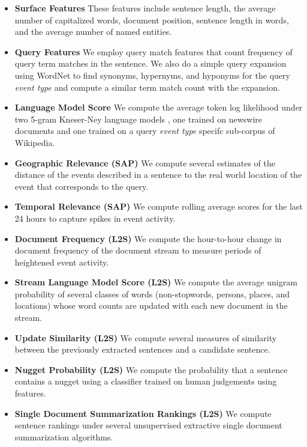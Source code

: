 \begin{itemize}
    \item \textbf{Surface Features} These features 
include sentence length, the average number of capitalized words,
document position, sentence length in words, and the average number of 
named entities.
    \item \textbf{Query Features} We employ query match features that count frequency of query term matches
in the sentence. We also do a simple query expansion using WordNet 
\citep{miller1995wordnet}
to find  synonyms, hypernyms, and hyponyms for the query \textit{event type}
and compute
a similar term match count with the expansion.
    \item \textbf{Language Model Score} We compute the 
        average token log likelihood under two 5-gram Kneser-Ney language 
        models \citep{kneser1995improved}, one trained on newswire documents 
        and one trained on a query 
        \textit{event type} specifc sub-corpus of Wikipedia.
    \item \textbf{Geographic Relevance (SAP)} We compute several estimates of the
        distance of the events described in a sentence to the 
        real world location of the event that corresponds to the query.
    \item \textbf{Temporal Relevance (SAP)} We compute rolling average \tfidf{} 
        scores for the last 24 hours to capture spikes in event activity.
    \item \textbf{Document Frequency (L2S)} We compute the hour-to-hour
        change in document
        frequency of the document stream to measure periods of heightened
        event activity. 
    \item \textbf{Stream Language Model Score (L2S)} We compute the average 
        unigram probability of several classes of words (non-stopwords, 
        persons,
        places, and locations) whose word counts are updated with each new 
        document in the stream.
    \item \textbf{Update Similarity (L2S)} We compute several measures of similarity
        between the previously extracted sentences and a candidate sentence.
    \item \textbf{Nugget Probability (L2S)} We compute the probability that a
        sentence contains a nugget using a classifier trained on human 
        judgements using \ngram{} features.
    \item \textbf{Single Document Summarization Rankings (L2S)} We compute sentence
        rankings under several unsupervised extractive single document 
        summarization algorithms.
\end{itemize}


